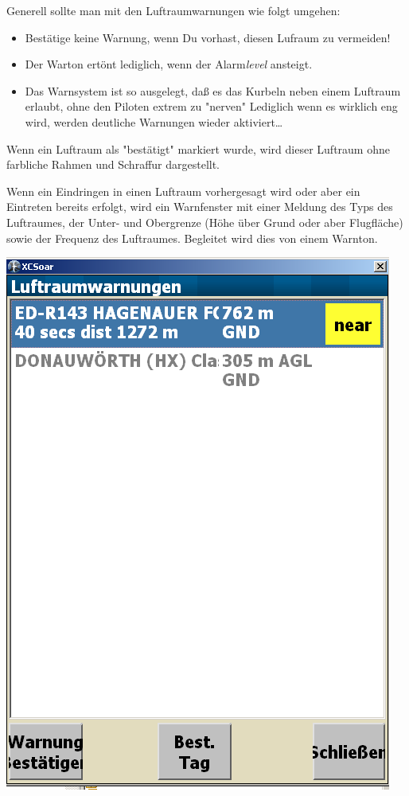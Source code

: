 Generell sollte man mit den Luftraumwarnungen wie folgt umgehen:
\begin{itemize}
\item Bestätige keine Warnung, wenn Du vorhast, diesen Lufraum zu vermeiden!
\item Der Warton ertönt lediglich, wenn der Alarm\textsl{level} ansteigt.
\item Das Warnsystem ist so ausgelegt, daß es das Kurbeln neben einem Luftraum erlaubt,
ohne den Piloten extrem zu "nerven" Lediglich wenn es wirklich eng wird, werden
deutliche Warnungen wieder aktiviert\dots
\end{itemize}

Wenn ein Luftraum als "bestätigt" markiert wurde, wird dieser Luftraum
ohne farbliche Rahmen und Schraffur dargestellt.

Wenn ein Eindringen in einen Luftraum vorhergesagt wird oder aber ein
Eintreten bereits erfolgt, wird ein Warnfenster mit einer Meldung des Typs
des Luftraumes, der Unter- und Obergrenze (Höhe über Grund oder aber
Flugfläche) sowie der Frequenz des Luftraumes.
Begleitet wird dies von einem Warnton.


\begin{center}
\includegraphics[angle=0,width=0.7\linewidth,keepaspectratio='true']{figures/airspacewarning.png}
\end{center}

